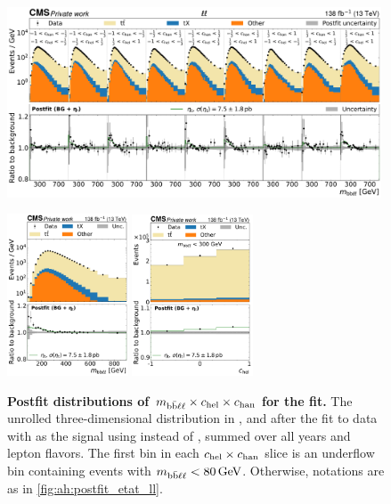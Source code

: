 \begin{figure}[p]
    \centering
    \includegraphics[width=0.99\textwidth]{figures/ah/prepost/EtaT_mbbllspin_fit_s_ll_run2_both.pdf}
    \caption{
        \label{fig:ah:postfit_mbbll_3D}
        \textbf{Postfit distributions of $m_{\mathrm{b\bar{b}\ell\ell}} \times c_{\mathrm{hel}} \times c_{\mathrm{han}}$ for the \etat fit.} The unrolled three-dimensional distribution in \mbbll, \chel and \chan after the fit to data with \etat as the signal using \mbbll instead of \mtt, summed over all years and lepton flavors. The first \mbbll bin in each $c_{\mathrm{hel}} \times c_{\mathrm{han}}$ slice is an underflow bin containing events with $\mbbll < \SI{80}{\GeV}$. Otherwise, notations are as in \cref{fig:ah:postfit_etat_ll}.
    }
    \vspace{1cm}
    \includegraphics[width=0.32\textwidth]{figures/ah/prepost/EtaT_mbbllspin_fit_s_ll_run2_both_mbbll.pdf}
    \hfill
    \includegraphics[width=0.32\textwidth]{figures/ah/prepost/EtaT_mbbllspin_fit_s_ll_run2_both_chel_mbblllt300.pdf}

\end{figure}
